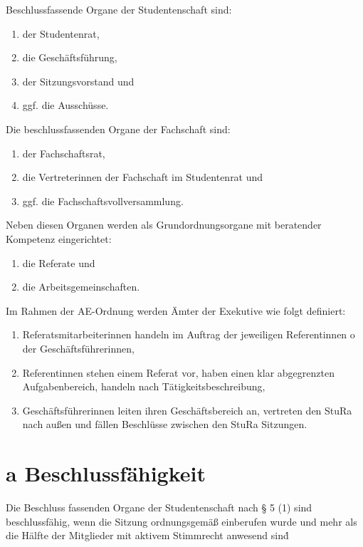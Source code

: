 \begin{multicols}{2}
\Abs \Satz Beschlussfassende Organe der Studentenschaft sind:
\begin{enumerate}
\item der Studentenrat,
\item die Geschäftsführung,
\item der Sitzungsvorstand und
\item ggf. die Ausschüsse.
\end{enumerate}

\Abs \Satz Die beschlussfassenden Organe der Fachschaft sind:
\begin{enumerate}
\item der Fachschaftsrat,
\item die Vertreterinnen der Fachschaft im Studentenrat und
\item ggf. die Fachschaftsvollversammlung.
\end{enumerate}

\Abs \Satz Neben diesen Organen werden als Grundordnungsorgane mit beratender Kompetenz eingerichtet:
\begin{enumerate}
\item die Referate und
\item die Arbeitsgemeinschaften.
\end{enumerate}

\Abs \Satz Im Rahmen der AE-Ordnung werden Ämter der Exekutive wie folgt definiert:
\begin{enumerate}
\item Referatsmitarbeiterinnen handeln im Auftrag der jeweiligen Referentinnen o der Geschäftsführerinnen,
\item Referentinnen stehen einem Referat vor, haben einen klar abgegrenzten Aufgabenbereich, handeln nach Tätigkeitsbeschreibung,
\item Geschäftsführerinnen leiten ihren Geschäftsbereich an, vertreten den StuRa nach außen und fällen Beschlüsse zwischen den StuRa Sitzungen.
\end{enumerate}

\setcounter{section}{4}
\section{a Beschlussfähigkeit}
\Abs \Satz Die Beschluss fassenden Organe der Studentenschaft nach § 5 (1) sind beschlussfähig, wenn die Sitzung ordnungsgemäß einberufen wurde und mehr als die Hälfte der Mitglieder mit aktivem Stimmrecht anwesend sind\.
\setcounter{section}{5}


\end{multicols}
